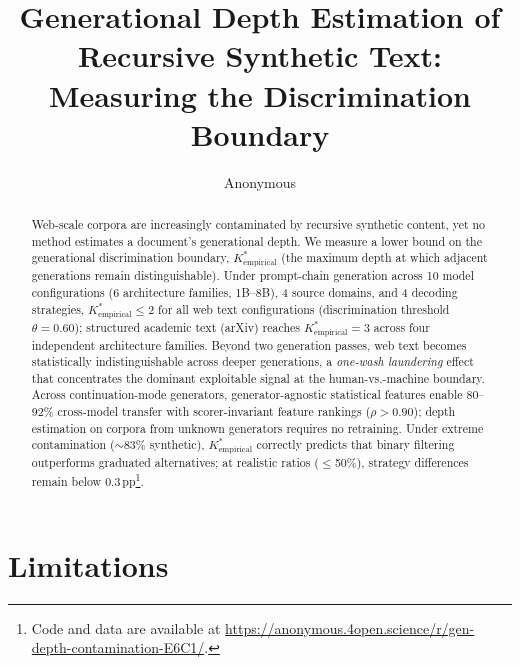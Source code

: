 \documentclass[11pt]{article}
\title{Generational Depth Estimation of Recursive Synthetic Text:\\Measuring the Discrimination Boundary}
\author{Anonymous}
\newcommand{\Kempirical}{{K^*_{\text{empirical}}}}
\begin{document}
\maketitle

\begin{abstract}
Web-scale corpora are increasingly contaminated by recursive synthetic content, yet no method estimates a document's generational depth.
We measure a lower bound on the generational discrimination boundary, $\Kempirical$ (the maximum depth at which adjacent generations remain distinguishable).
Under prompt-chain generation across 10 model configurations (6 architecture families, 1B--8B), 4 source domains, and 4 decoding strategies, $\Kempirical \leq 2$ for all web text configurations (discrimination threshold $\theta{=}0.60$); structured academic text (arXiv) reaches $\Kempirical{=}3$ across four independent architecture families.
Beyond two generation passes, web text becomes statistically indistinguishable across deeper generations, a \emph{one-wash laundering} effect that concentrates the dominant exploitable signal at the human-vs.-machine boundary.
Across continuation-mode generators, generator-agnostic statistical features enable 80--92\% cross-model transfer with scorer-invariant feature rankings ($\rho > 0.90$); depth estimation on corpora from unknown generators requires no retraining.
Under extreme contamination (${\sim}$83\% synthetic), $\Kempirical$ correctly predicts that binary filtering outperforms graduated alternatives; at realistic ratios ($\leq$50\%), strategy differences remain below 0.3\,pp\footnote{Code and data are available at \url{https://anonymous.4open.science/r/gen-depth-contamination-E6C1/}.}.
\end{abstract}















\newpage
\section*{Limitations}
\end{document}
